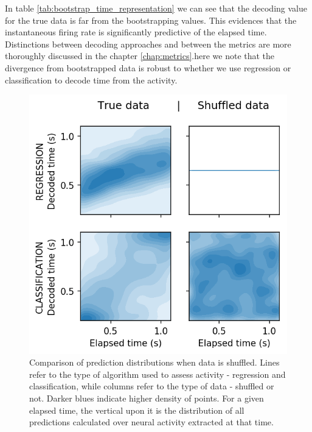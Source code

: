     In table \ref{tab:bootstrap_time_representation} we can see that the decoding value for the true data is far from the bootstrapping values. This evidences that the instantaneous firing rate is significantly predictive of the elapsed time. Distinctions between decoding approaches and between the metrics are more thoroughly discussed in the chapter \ref{chap:metrics}.here we note that the divergence from bootstrapped data is robust to whether we use regression or classification to decode time from the activity. 
    
    \begin{figure}[ht]
        \centering
        \includegraphics{figures/decoding_kde_bootstrap_vs_true_31.png}
        \caption[Comparison of prediction distributions when data is shuffled]{Comparison of prediction distributions when data is shuffled. Lines refer to the type of algorithm used to assess activity - regression and classification, while columns refer to the type of data - shuffled or not. Darker blues indicate higher density of points. For a given elapsed time, the vertical upon it is the distribution of all predictions calculated over neural activity extracted at that time.}
        \label{fig:decoding_kde_boot}
    \end{figure}
    

